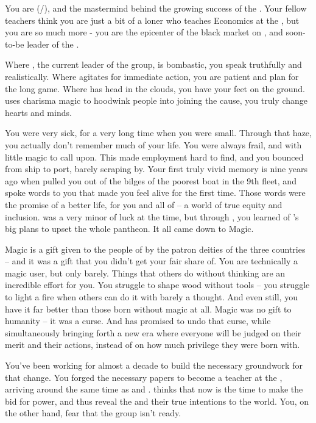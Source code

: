 \documentclass[char]{GL2020}
\begin{document}
\name{\cChupSecond{}}

You are \cChupSecond{\full} (\cChupSecond{\they}/\cChupSecond{\them}), and the mastermind behind the growing success of the \pGoaties{}. Your fellow teachers think you are just a bit of a loner who teaches Economics at the \pSchool{}, but you are so much more - you are the epicenter of the black market on \pEarth{}, and soon-to-be leader of the \pGoaties{}.

Where \cChupLeader{\full}, the current leader of the group, is bombastic, you speak truthfully and realistically. Where \cChupLeader{} agitates for immediate action, you are patient and plan for the long game. Where \cChupLeader{} has \cChupLeader{\their} head in the clouds, you have your feet on the ground. \cChupLeader{} uses charisma magic to hoodwink people into joining the cause, you truly change hearts and minds.

You were very sick, for a very long time when you were small. Through that haze, you actually don't remember much of your life. You were always frail, and with little magic to call upon. This made employment hard to find, and you bounced from ship to port, barely scraping by. Your first truly vivid memory is nine years ago when \cChupLeader{} pulled you out of the bilges of the poorest boat in the 9th fleet, and spoke words to you that made you feel alive for the first time. Those words were the promise of a better life, for you and all of \pEarth{} -- a world of true equity and inclusion. \cGenesis{} was a very minor \cGenesis{\God} of luck at the time, but through \cChupLeader{}, you learned of \cGenesis{}'s big plans to upset the whole pantheon. It all came down to Magic. 

Magic is a gift given to the people of \pEarth{} by the patron deities of the three countries -- and it was a gift that you didn't get your fair share of. You are technically a magic user, but only barely. Things that others do without thinking are an incredible effort for you. You struggle to shape wood without tools -- you struggle to light a fire when others can do it with barely a thought. And even still, you have it far better than those born without magic at all. Magic was no gift to humanity -- it was a curse. And \cGenesis{} has promised to undo that curse, while simultaneously bringing forth a new era where everyone will be judged on their merit and their actions, instead of on how much privilege they were born with.

You've been working for almost a decade to build the necessary groundwork for that change. You forged the necessary papers to become a teacher at the \pSchool{}, arriving around the same time as \cPrince{\full} and \cChupInventor{\full}. \cChupLeader{} thinks that now is the time to make the bid for power, and thus reveal the \pGoaties{} and their true intentions to the world. You, on the other hand, fear that the group isn't ready. 
\end{document}
